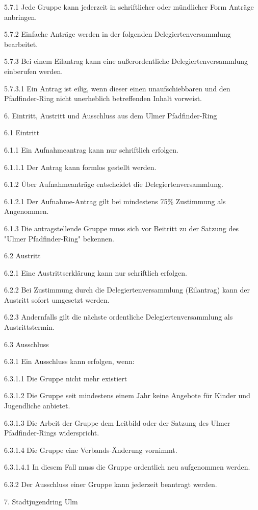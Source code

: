 5.7.1 Jede Gruppe kann jederzeit in schriftlicher oder mündlicher Form Anträge anbringen.

5.7.2 Einfache Anträge werden in der folgenden Delegiertenversammlung bearbeitet.

5.7.3 Bei einem Eilantrag kann eine außerordentliche Delegiertenversammlung einberufen werden.

5.7.3.1 Ein Antrag ist eilig, wenn dieser einen unaufschiebbaren und den Pfadfinder-Ring nicht unerheblich betreffenden Inhalt vorweist.

6. Eintritt, Austritt und Ausschluss aus dem Ulmer Pfadfinder-Ring

6.1 Eintritt

6.1.1 Ein Aufnahmeantrag kann nur schriftlich erfolgen.

6.1.1.1 Der Antrag kann formlos gestellt werden.

6.1.2 Über Aufnahmeanträge entscheidet die Delegiertenversammlung.

6.1.2.1 Der Aufnahme-Antrag gilt bei mindestens 75\% Zustimmung als Angenommen.

6.1.3 Die antragstellende Gruppe muss sich vor Beitritt zu der Satzung des "Ulmer Pfadfinder-Ring" bekennen.

6.2 Austritt

6.2.1 Eine Austrittserklärung kann nur schriftlich erfolgen.

6.2.2 Bei Zustimmung durch die Delegiertenversammlung (Eilantrag) kann der Austritt sofort umgesetzt werden.

6.2.3 Andernfalls gilt die nächste ordentliche Delegiertenversammlung als Austrittstermin.

6.3 Ausschluss

6.3.1 Ein Ausschluss kann erfolgen, wenn:

6.3.1.1 Die Gruppe nicht mehr existiert

6.3.1.2 Die Gruppe seit mindestens einem Jahr keine Angebote für Kinder und Jugendliche anbietet.

6.3.1.3 Die Arbeit der Gruppe dem Leitbild oder der Satzung des Ulmer Pfadfinder-Rings widerspricht.

6.3.1.4 Die Gruppe eine Verbands-Änderung vornimmt.

6.3.1.4.1 In diesem Fall muss die Gruppe ordentlich neu aufgenommen werden.

6.3.2 Der Ausschluss einer Gruppe kann jederzeit beantragt werden.

7. Stadtjugendring Ulm

